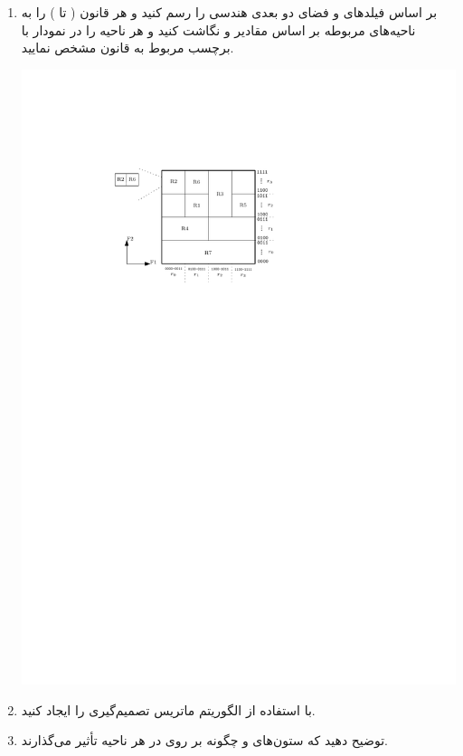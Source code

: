 \begin{enumerate}
	\item 
	بر اساس فیلدهای  و  فضای دو بعدی هندسی را رسم کنید و هر قانون ( تا ) را به ناحیه‌های مربوطه بر اساس مقادیر  و  نگاشت کنید و هر ناحیه را در نمودار با برچسب مربوط به قانون مشخص نمایید.
	\begin{qsolve}
		\begin{center}
			\includegraphics*[width=0.7\linewidth]{pics/Q3_a.pdf}
		\end{center}
	\end{qsolve}
	
	
	\item 
	با استفاده از الگوریتم  ماتریس تصمیم‌گیری را ایجاد کنید.
	\begin{qsolve}
		
	\end{qsolve}
	
	\item 
	توضیح دهید که ستون‌های  و  چگونه بر روی  در هر ناحیه تأثیر می‌گذارند.
	\begin{qsolve}
		
	\end{qsolve}
\end{enumerate}